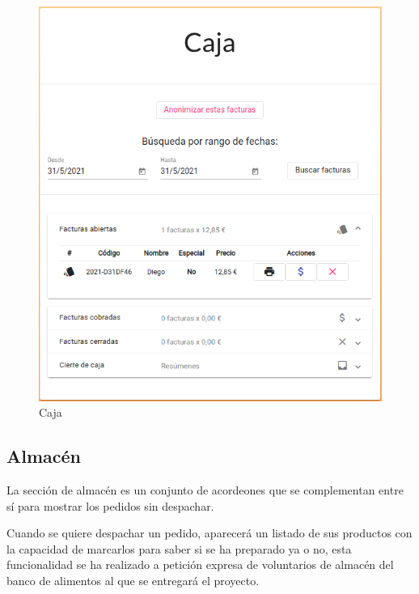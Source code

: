\begin{figure}[h]
\centering
\includegraphics[scale=0.47]{archivos/caja.png}
\caption{Caja}
\label{fig:caja}
\end{figure}
\clearpage

\subsection{Almacén}
La sección de almacén es un conjunto de acordeones que se complementan entre sí para mostrar los pedidos sin despachar.
\vspace{1em}
\par Cuando se quiere despachar un pedido, aparecerá un listado de sus productos con la capacidad de marcarlos para saber si se ha preparado ya o no, esta funcionalidad se ha realizado a petición expresa de voluntarios de almacén del banco de alimentos al que se entregará el proyecto.

